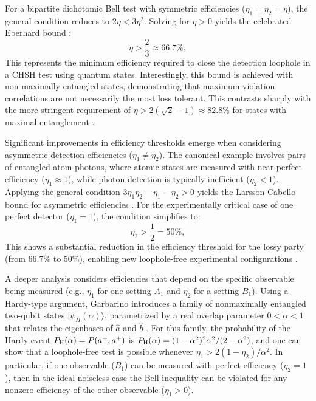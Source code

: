 \documentclass[aps,pra,reprint, superscriptaddress,showkeys]{revtex4-2}
\theoremstyle{plain}
\begin{document}
For a bipartite dichotomic Bell test with symmetric efficiencies ($\eta_1 = \eta_2 = \eta$), the general condition reduces to $2\eta < 3\eta^2$. Solving for $\eta > 0$ yields the celebrated Eberhard bound \cite{Eberhard93}:
\begin{equation}
\eta > \frac{2}{3} \approx 66.7\%,
\end{equation}
This represents the minimum efficiency required to close the detection loophole in a CHSH test using quantum states. Interestingly, this bound is achieved with non-maximally entangled states, demonstrating that maximum-violation correlations are not necessarily the most loss tolerant. This contrasts sharply with the more stringent requirement of $\eta > 2(\sqrt{2} - 1) \approx 82.8\%$ for states with maximal entanglement \cite{Clauser.Horne}. 

Significant improvements in efficiency thresholds emerge when considering asymmetric detection efficiencies ($\eta_1 \neq \eta_2$). The canonical example involves pairs of entangled atom-photons, where atomic states are measured with near-perfect efficiency ($\eta_1 \approx 1$), while photon detection is typically inefficient ($\eta_2 < 1$). Applying the general condition $3\eta_1\eta_2 - \eta_1 - \eta_2 > 0$ yields the Larsson-Cabello bound for asymmetric efficiencies \cite{CabelloLarsson}. For the experimentally critical case of one perfect detector ($\eta_1 = 1$), the condition simplifies to:
\begin{equation}
\eta_2 > \frac{1}{2} = 50\%,
\end{equation}
This shows a substantial reduction in the efficiency threshold for the lossy party (from 66.7\% to 50\%), enabling new loophole-free experimental configurations \cite{Teo2013}.


A deeper analysis considers efficiencies that depend on the specific
observable being measured (e.g., $\eta_1$ for one setting $A_1$ and
$\eta_2$ for a setting $B_1$). Using a Hardy-type argument,
Garbarino introduces a family of nonmaximally entangled two-qubit
states $|\psi_H(\alpha)\rangle$, parametrized by a real overlap
parameter $0<\alpha<1$ that relates the eigenbases of $\hat a$ and
$\hat b$ \cite{Garbarino2010}. For this family, the probability of the
Hardy event $P_{\rm H}(\alpha)=P(a^+,a^+)$ is
$P_{\rm H}(\alpha) = (1-\alpha^2)^2 \alpha^2 / (2-\alpha^2)$, and one
can show that a loophole-free test is possible whenever
$\eta_1 > 2(1-\eta_2)/\alpha^2$. In particular, if one observable
($B_1$) can be measured with perfect efficiency ($\eta_2 = 1$), then
in the ideal noiseless case the Bell inequality can be violated for
any nonzero efficiency of the other observable ($\eta_1>0$).
\end{document}
